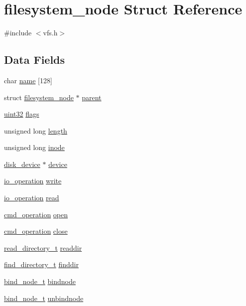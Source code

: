 \hypertarget{structfilesystem__node}{
\section{filesystem\_\-node Struct Reference}
\label{structfilesystem__node}
}


{\ttfamily \#include $<$vfs.h$>$}

\subsection*{Data Fields}
\begin{DoxyCompactItemize}
\item 
char \hyperlink{structfilesystem__node_afa5e9c7fb847e9afe73997d69e961346}{name} \mbox{[}128\mbox{]}
\item 
struct \hyperlink{structfilesystem__node}{filesystem\_\-node} $\ast$ \hyperlink{structfilesystem__node_ab3018c8aaf8bafd7a2c85f467887d3d3}{parent}
\item 
\hyperlink{int__types_8h_a1134b580f8da4de94ca6b1de4d37975e}{uint32} \hyperlink{structfilesystem__node_a99cca728c467d0996145533ebb1b7d6b}{flags}
\item 
unsigned long \hyperlink{structfilesystem__node_a4d273cc3bb51e987b660ec3e5389389a}{length}
\item 
unsigned long \hyperlink{structfilesystem__node_a4bd1dd0eb66e269e50dc84b4700d153d}{inode}
\item 
\hyperlink{structdisk__device}{disk\_\-device} $\ast$ \hyperlink{structfilesystem__node_abbd4a067154755521156cf66afec15b6}{device}
\item 
\hyperlink{vfs_8h_a8a01766e597d4b5460e7492165497840}{io\_\-operation} \hyperlink{structfilesystem__node_aea69bcf76b190d8d85745816ed072e75}{write}
\item 
\hyperlink{vfs_8h_a8a01766e597d4b5460e7492165497840}{io\_\-operation} \hyperlink{structfilesystem__node_a085044cdf553849d4b6719c13242c565}{read}
\item 
\hyperlink{vfs_8h_ad910bfb61b46ca535ff2eca0402c3c9c}{cmd\_\-operation} \hyperlink{structfilesystem__node_a3c2d29f74f04c0f194103842a433cd71}{open}
\item 
\hyperlink{vfs_8h_ad910bfb61b46ca535ff2eca0402c3c9c}{cmd\_\-operation} \hyperlink{structfilesystem__node_af6ffe9e86be2473a7e7d250cc428f682}{close}
\item 
\hyperlink{vfs_8h_a8a1194e474c976c843e89160c4952553}{read\_\-directory\_\-t} \hyperlink{structfilesystem__node_aa0897739cc3714c617920250c743f8c4}{readdir}
\item 
\hyperlink{vfs_8h_a1346048d296b171432318f1dc34a57e8}{find\_\-directory\_\-t} \hyperlink{structfilesystem__node_a60a6af56c8e909f3de33a189309f2444}{finddir}
\item 
\hyperlink{vfs_8h_a8681ccabf6da3c6e3f97a3274157b331}{bind\_\-node\_\-t} \hyperlink{structfilesystem__node_acfa8d590a2f85e52e5653e6616a1019f}{bindnode}
\item 
\hyperlink{vfs_8h_a8681ccabf6da3c6e3f97a3274157b331}{bind\_\-node\_\-t} \hyperlink{structfilesystem__node_a9b9b272d32b2dd8402bc00bc4cf58994}{unbindnode}
\end{DoxyCompactItemize}


